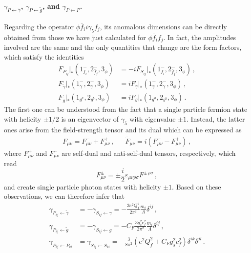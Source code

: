 \paragraph{$\gamma_{P\leftarrow \tilde \gamma}$, $\gamma_{P \leftarrow \tilde g}$, and $\gamma_{P\leftarrow P}$.}
\label{par:Phiff}
Regarding the operator $\phi \bar f_i i \gamma_5 f_j$, its anomalous dimensions can be directly obtained from those we have just calculated for $\phi \bar f_i  f_j$.
In fact, the amplitudes involved are the same and the only quantities that change are the form factors, which satisfy the identities
\begin{align}
    F_{P_{ij}}|_*(1_{f_i}^-,2_{\bar f_j}^-,3_\phi) &= -i F_{S_{ij}}|_*(1_{f_i}^-,2_{\bar f_j}^-,3_\phi)\,,\\
    F_{\tilde\gamma}|_* (1^-_\gamma,2^-_\gamma,3_\phi)&=iF_\gamma|_* (1^-_\gamma,2^-_\gamma,3_\phi)\,,\\
    F_{\tilde g}|_* (1^-_{g^a},2^-_{g^b},3_\phi)&=iF_g|_* (1^-_{g^a},2^-_{g^b},3_\phi)\,.
\end{align}
The first one can be understood from the fact that a single particle fermion state with helicity $\pm 1/2$ is an eigenvector of $\gamma_5$ with eigenvalue $\pm 1$.
Instead, the latter ones arise from the field-strength tensor and its dual which can be expressed as
\begin{align}
\label{eq:Obs1}
    F_{\mu\nu}=F^-_{\mu\nu}+F^+_{\mu\nu} \,, && 
    \tilde F_{\mu\nu}=i\left(F^-_{\mu\nu}-F^+_{\mu\nu}\right)\,,
\end{align}
where 
$F^{+}_{\mu\nu}$ and $F^{-}_{\mu\nu}$ are self-dual 
and anti-self-dual tensors, respectively, which read
\begin{equation}
    F^{\pm}_{\mu\nu} = \pm \frac{i}{2}\varepsilon_{\mu\nu\rho\sigma}F^{\pm \, \rho\sigma}\,,
\end{equation}
and create single particle photon states with helicity $\pm 1$.
Based on these observations, we can therefore infer that
\begin{align}
    \gamma_{P_{ij}\leftarrow \tilde\gamma} &= - \gamma_{S_{ij}\leftarrow \gamma} = - \frac{3e^2Q_f^2}{2\pi^2}\frac{m_i}{\Lambda}\delta^{ij} \,,\\
    \gamma_{P_{ij}\leftarrow \tilde g} &= - \gamma_{S_{ij}\leftarrow g} = - C_F\frac{3g_s^2c_f^2}{2\pi^2}\frac{m_i}{\Lambda}\delta^{ij} \,,\\
    \gamma_{P_{ij}\leftarrow P_{kl}} &= \gamma_{S_{ij}\leftarrow S_{kl}} = -\frac{3}{8\pi^2}(e^2Q_f^2+C_Fg_s^2c_f^2)\delta^{ik}\delta^{jl} \,.
\end{align}




